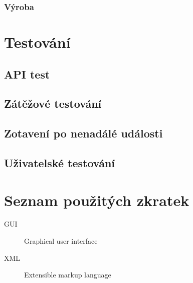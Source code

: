 \documentclass[thesis=B,czech]{FITthesis}[2019/12/23]
\begin{document}
\subsection{Výroba}



\chapter{Testování}

\section{API test}

\section{Zátěžové testování}

\section{Zotavení po nenadálé události}

\section{Uživatelské testování}



\begin{conclusion}
\end{conclusion}




\appendix

\chapter{Seznam použitých zkratek}
\begin{description}
	\item[GUI] Graphical user interface
	\item[XML] Extensible markup language
\end{description}
\end{document}
